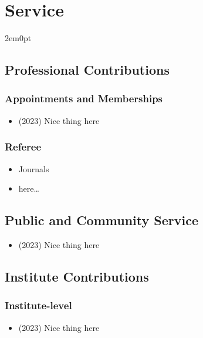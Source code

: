 \documentclass[11pt]{article}
\begin{document}
\section{Service}
\begin{adjustwidth}{2em}{0pt}

\subsection{Professional Contributions}

\subsubsection{Appointments and Memberships}

\begin{itemize}
    \item (2023) Nice thing here 
\end{itemize}

\subsubsection{Referee}

\begin{itemize}
    \item Journals 
    \item here\dots
\end{itemize}

\subsection{Public and Community Service}

\begin{itemize}
    \item (2023) Nice thing here 
\end{itemize}

\subsection{Institute Contributions}

\subsubsection{Institute-level}

\begin{itemize}
    \item (2023) Nice thing here 
\end{itemize}


\end{adjustwidth}
\end{document}
